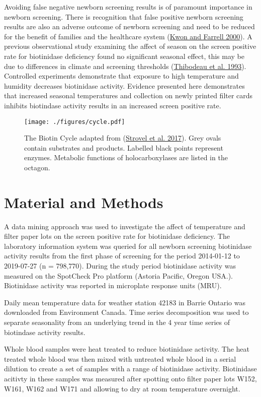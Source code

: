 \documentclass[review]{elsarticle}
\begin{document}
Avoiding false negative newborn screening results is of paramount
importance in newborn screening. There is recognition that false
positive newborn screening results are also an adverse outcome of
newborn screening and need to be reduced for the benefit of families
and the healthcare system (\hyperlink{citeproc_bib_item_3}{Kwon and Farrell 2000}). A previous observational
study examining the affect of season on the screen positive rate for
biotinidase deficiency found no significant seasonal effect, this may
be due to differences in climate and screening thresholds (\hyperlink{citeproc_bib_item_8}{Thibodeau et al. 1993}). Controlled experiments demonstrate that
exposure to high temperature and humidity decreases biotinidase
activity. Evidence presented here demonstrates that increased seasonal
temperatures and collection on newly printed filter cards inhibits
biotindase activity results in an increased screen positive rate.



\begin{figure}[htbp]
\centering
\texttt{[image: ./figures/cycle.pdf]}
\caption{\label{fig:org6443af0}The Biotin Cycle adapted from (\hyperlink{citeproc_bib_item_6}{Strovel et al. 2017}). Grey ovals contain substrates and products. Labelled black points represent enzymes. Metabolic functions of holocarboxylases are listed in the octagon.}
\end{figure}

\section*{Material and Methods}
\label{sec:org2cca2fb}
A data mining approach was used to investigate the affect of
temperature and filter paper lots on the screen positive rate for
biotinidase deficiency. The laboratory information system was queried
for all newborn screening biotinidase activity results from the first
phase of screening for the period 2014-01-12 to 2019-07-27 (n =
798,770). During the study period biotinidase activity was measured on
the SpotCheck Pro platform (Astoria Pacific, Oregon USA.). Biotinidase
activity was reported in microplate response units (MRU).

Daily mean temperature data for weather station 42183 in Barrie
Ontario was downloaded from Environment Canada. Time series
decomposition was used to separate seasonality from an underlying
trend in the 4 year time series of biotindase activity results.

Whole blood samples were heat treated to reduce biotinidase
activity. The heat treated whole blood was then mixed with untreated
whole blood in a serial dilution to create a set of samples with a
range of biotinidase activity. Biotinidase acitivty in these samples
was measured after spotting onto filter paper lots W152, W161, W162
and W171 and allowing to dry at room temperature overnight.
\end{document}
